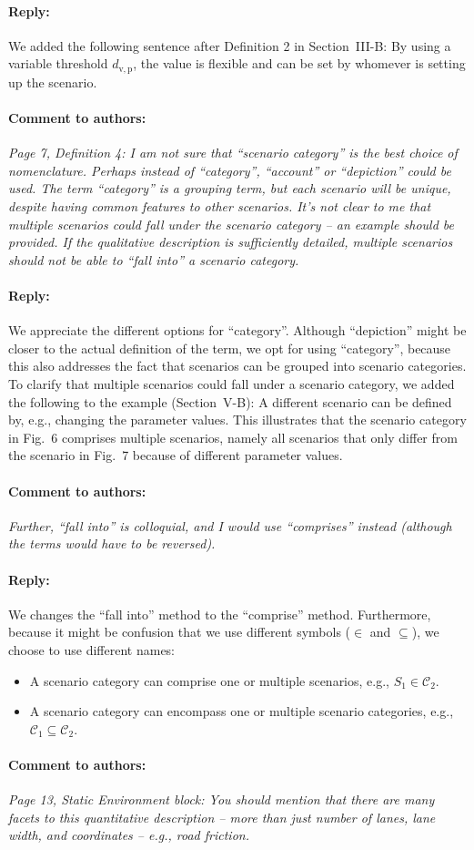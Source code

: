 \documentclass[10pt,final,a4paper,oneside,onecolumn]{article}
\newcommand{\toauthor}{\paragraph*{Comment to authors:} \itshape}
\newcommand{\fromauthor}{\paragraph*{Reply:} \normalfont}
\newcommand{\cstart}{\cbstart\color{red}}
\newcommand{\cend}{\cbend\color{black}}
\newcommand{\distancecondition}{d_{\mathrm{v,p}}}
\newcommand{\scenario}{S}
\newcommand{\scenarioa}{\scenario_{1}}
\newcommand{\scenariofallsinto}{\in}
\newcommand{\scenariocategory}{\mathcal{C}}
\newcommand{\scenariocategorya}{\scenariocategory_{1}}
\newcommand{\scenariocategoryb}{\scenariocategory_{2}}
\newcommand{\scenariocategoryfallsinto}{\subseteq}
\begin{document}
\fromauthor We added the following sentence after Definition 2 in Section~III-B: \cstart By using a variable threshold $\distancecondition$, the value is flexible and can be set by whomever is setting up the scenario.\cend

\toauthor Page 7, Definition 4: I am not sure that ``scenario category'' is the best choice of nomenclature. Perhaps instead of ``category'', ``account'' or ``depiction'' could be used. The term ``category'' is a grouping term, but each scenario will be unique, despite having common features to other scenarios. It's not clear to me that multiple scenarios could fall under the scenario category -- an example should be provided. If the qualitative description is sufficiently detailed, multiple scenarios should not be able to ``fall into'' a scenario category.

\fromauthor We appreciate the different options for ``category''. Although ``depiction'' might be closer to the actual definition of the term, we opt for using ``category'', because this also addresses the fact that scenarios can be grouped into scenario categories. To clarify that multiple scenarios could fall under a scenario category, we added the following to the example (Section~V-B): \cstart A different scenario can be defined by, e.g., changing the parameter values. This illustrates that the scenario category in Fig.~6 comprises multiple scenarios, namely all scenarios that only differ from the scenario in Fig.~7 because of different parameter values.\cend

\toauthor Further, ``fall into'' is colloquial, and I would use ``comprises'' instead (although the terms would have to be reversed).

\fromauthor We changes the ``fall into'' method to the ``\cstart comprise\cend'' method. Furthermore, because it might be confusion that we use different symbols ($\scenariofallsinto$ and $\scenariocategoryfallsinto$), we choose to use different names:
\begin{itemize}
	\item A scenario category can \cstart comprise \cend one or multiple scenarios, e.g., $\scenarioa \scenariofallsinto \scenariocategoryb$.
	\item A scenario category can \cstart encompass \cend one or multiple scenario categories, e.g., $\scenariocategorya \scenariocategoryfallsinto \scenariocategoryb$.
\end{itemize}

\toauthor Page 13, Static Environment block: You should mention that there are many facets to this quantitative description -- more than just number of lanes, lane width, and coordinates -- e.g., road friction.
\end{document}
